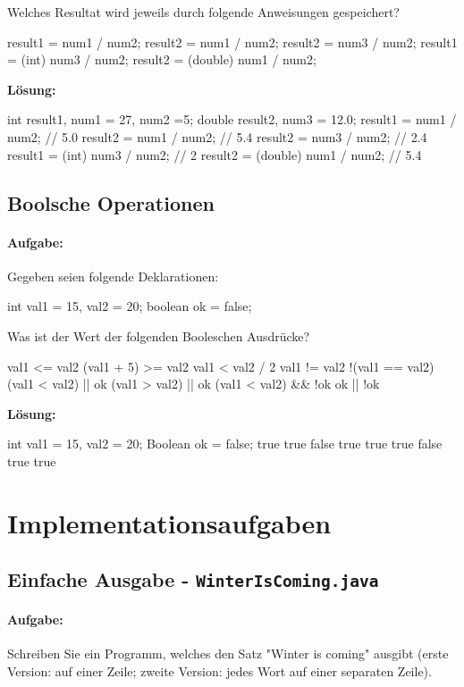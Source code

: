 \documentclass[a4paper,10pt, dvipsnames]{report}
\begin{document}
Welches Resultat wird jeweils durch folgende Anweisungen gespeichert?
\begin{javacodebox}
result1 = num1 / num2;
result2 = num1 / num2;
result2 = num3 / num2;
result1 = (int) num3 / num2;
result2 = (double) num1 / num2;
\end{javacodebox}

\textbf{Lösung:}
\begin{javacodebox}
int result1, num1 = 27, num2 =5;
double result2, num3 = 12.0;
result1 = num1 / num2; // 5.0
result2 = num1 / num2; // 5.4
result2 = num3 / num2; // 2.4
result1 = (int) num3 / num2; // 2
result2 = (double) num1 / num2; // 5.4
\end{javacodebox}

\subsection{Boolsche Operationen}

\paragraph{Aufgabe:}
Gegeben seien folgende Deklarationen:
\begin{javacodebox}
int val1 = 15, val2 = 20;
boolean ok = false;
\end{javacodebox}

Was ist der Wert der folgenden Booleschen Ausdrücke?
\begin{javacodebox}
val1 <= val2
(val1 + 5) >= val2
val1 < val2 / 2
val1 != val2
!(val1 == val2)
(val1 < val2) || ok
(val1 > val2) || ok
(val1 < val2) && !ok
ok || !ok   
\end{javacodebox}

\textbf{Lösung:}

\begin{javacodebox}
int val1 = 15, val2 = 20;
Boolean ok = false;
true
true
false
true
true
true
false
true
true
\end{javacodebox}

\section{Implementationsaufgaben}

\subsection{Einfache Ausgabe - \texttt{WinterIsComing.java}}

\paragraph{Aufgabe:}
Schreiben Sie ein Programm, welches den Satz "Winter is coming" ausgibt (erste Version: auf einer Zeile; zweite Version: jedes Wort auf einer separaten Zeile).
\end{document}
